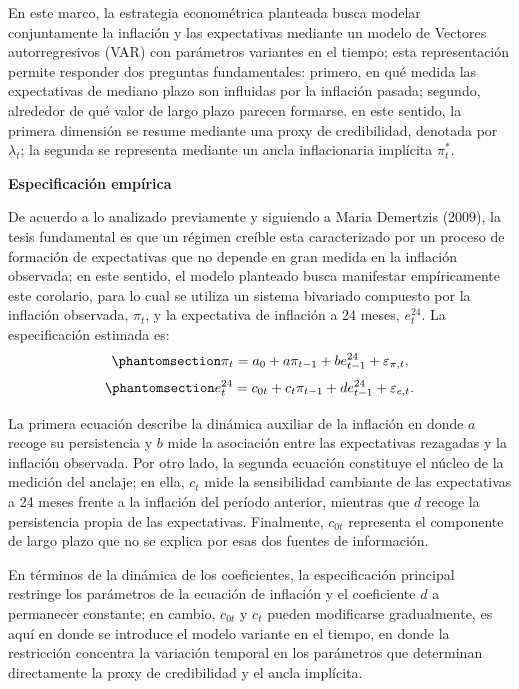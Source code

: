 \documentclass[
  10.5pt,
  letterpaper,
  twocolumn]{article}
\begin{document}
En este marco, la estrategia econométrica planteada busca modelar
conjuntamente la inflación y las expectativas mediante un modelo de
Vectores autorregresivos (VAR) con parámetros variantes en el tiempo;
esta representación permite responder dos preguntas fundamentales:
primero, en qué medida las expectativas de mediano plazo son influidas
por la inflación pasada; segundo, alrededor de qué valor de largo plazo
parecen formarse. en este sentido, la primera dimensión se resume
mediante una proxy de credibilidad, denotada por \(\lambda_t\); la
segunda se representa mediante un ancla inflacionaria implícita
\(\pi_t^{*}\).

\textbf{Especificación empírica}

De acuerdo a lo analizado previamente y siguiendo a Maria Demertzis
(2009), la tesis fundamental es que un régimen creíble esta
caracterizado por un proceso de formación de expectativas que no depende
en gran medida en la inflación observada; en este sentido, el modelo
planteado busca manifestar empíricamente este corolario, para lo cual se
utiliza un sistema bivariado compuesto por la inflación observada,
\(\pi_t\), y la expectativa de inflación a 24 meses, \(e_t^{24}\). La
especificación estimada es:\\
\begin{equation}\phantomsection\label{eq-demertzis-inflacion}{\pi_t=a_0+a\pi_{t-1}+b e_{t-1}^{24}+\varepsilon_{\pi,t},}\end{equation}\begin{equation}\phantomsection\label{eq-demertzis-expectativas}{e_t^{24}=c_{0t}+c_t\pi_{t-1}+d e_{t-1}^{24}+\varepsilon_{e,t}.}\end{equation}

La primera ecuación describe la dinámica auxiliar de la inflación en
donde \(a\) recoge su persistencia y \(b\) mide la asociación entre las
expectativas rezagadas y la inflación observada. Por otro lado, la
segunda ecuación constituye el núcleo de la medición del anclaje; en
ella, \(c_t\) mide la sensibilidad cambiante de las expectativas a 24
meses frente a la inflación del período anterior, mientras que \(d\)
recoge la persistencia propia de las expectativas. Finalmente,
\(c_{0t}\) representa el componente de largo plazo que no se explica por
esas dos fuentes de información.

En términos de la dinámica de los coeficientes, la especificación
principal restringe los parámetros de la ecuación de inflación y el
coeficiente \(d\) a permanecer constante; en cambio, \(c_{0t}\) y
\(c_t\) pueden modificarse gradualmente, es aquí en donde se introduce
el modelo variante en el tiempo, en donde la restricción concentra la
variación temporal en los parámetros que determinan directamente la
proxy de credibilidad y el ancla implícita.
\end{document}
